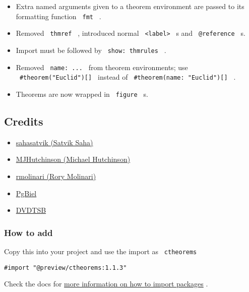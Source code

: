 \begin{itemize}
\tightlist
\item
  Extra named arguments given to a theorem environment are passed to its
  formatting function \texttt{\ fmt\ } .
\item
  Removed \texttt{\ thmref\ } , introduced normal
  \texttt{\ \textless{}label\textgreater{}\ } s and
  \texttt{\ @reference\ } s.
\item
  Import must be followed by \texttt{\ show:\ thmrules\ } .
\item
  Removed \texttt{\ name:\ ...\ } from theorem environments; use
  \texttt{\ \#theorem("Euclid"){[}{]}\ } instead of
  \texttt{\ \#theorem(name:\ "Euclid"){[}{]}\ } .
\item
  Theorems are now wrapped in \texttt{\ figure\ } s.
\end{itemize}

\subsection{Credits}\label{credits}

\begin{itemize}
\tightlist
\item
  \href{https://github.com/sahasatvik}{sahasatvik (Satvik Saha)}
\item
  \href{https://github.com/MJHutchinson}{MJHutchinson (Michael
  Hutchinson)}
\item
  \href{https://github.com/rmolinari}{rmolinari (Rory Molinari)}
\item
  \href{https://github.com/PgBiel}{PgBiel}
\item
  \href{https://github.com/DVDTSB}{DVDTSB}
\end{itemize}

\subsubsection{How to add}\label{how-to-add}

Copy this into your project and use the import as \texttt{\ ctheorems\ }

\begin{verbatim}
#import "@preview/ctheorems:1.1.3"
\end{verbatim}



Check the docs for
\href{https://typst.app/docs/reference/scripting/\#packages}{more
information on how to import packages} .

